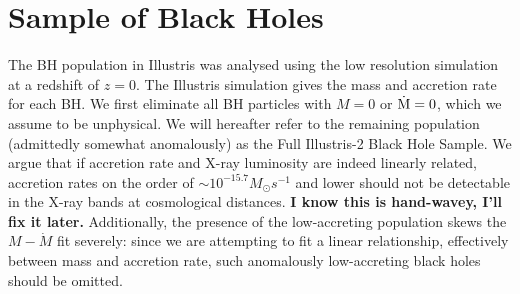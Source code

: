 \section{Sample of Black Holes}

\label{sec:sample}The BH population in Illustris was analysed using
the low resolution simulation at a redshift of $z=0$. The Illustris
simulation gives the mass and accretion rate for each BH. We first
eliminate all BH particles with $M=0$ or $\dot{{\rm M}}=0$, which
we assume to be unphysical. We will hereafter refer to the remaining
population (admittedly somewhat anomalously) as the Full Illustris-2
Black Hole Sample. We argue that if accretion rate and X-ray luminosity
are indeed linearly related, accretion rates on the order of $\sim10^{-15.7}M_{\odot}s^{-1}$
and lower should not be detectable in the X-ray bands at cosmological
distances. \textbf{I know this is hand-wavey, I'll fix it later.}
Additionally, the presence of the low-accreting population skews the
$M-\dot{M}$ fit severely: since we are attempting to fit a linear
relationship, effectively between mass and accretion rate, such anomalously
low-accreting black holes should be omitted.

